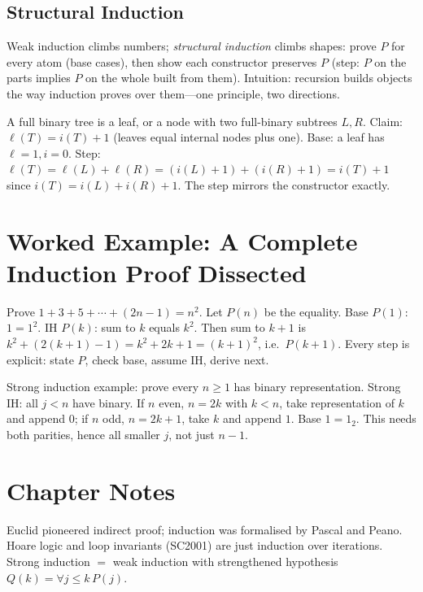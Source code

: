 \subsection{Structural Induction}
\label{sec:structural}
Weak induction climbs numbers; \emph{structural induction} climbs shapes: prove $P$ for every atom (base cases), then show each constructor preserves $P$ (step: $P$ on the parts implies $P$ on the whole built from them). Intuition: recursion builds objects the way induction proves over them---one principle, two directions.
\begin{example}
A full binary tree is a leaf, or a node with two full-binary subtrees $L,R$. Claim: $\ell(T)=i(T)+1$ (leaves equal internal nodes plus one). Base: a leaf has $\ell=1,i=0$. Step: $\ell(T)=\ell(L)+\ell(R)=(i(L)+1)+(i(R)+1)=i(T)+1$ since $i(T)=i(L)+i(R)+1$. The step mirrors the constructor exactly.
\end{example}

\section{Worked Example: A Complete Induction Proof Dissected}
Prove $1+3+5+\cdots+(2n-1)=n^2$. Let $P(n)$ be the equality. Base $P(1)$: $1=1^2$. IH $P(k)$: sum to $k$ equals $k^2$. Then sum to $k+1$ is $k^2+(2(k+1)-1)=k^2+2k+1=(k+1)^2$, i.e.\ $P(k+1)$. Every step is explicit: state $P$, check base, assume IH, derive next.

Strong induction example: prove every $n\ge1$ has binary representation. Strong IH: all $j<n$ have binary. If $n$ even, $n=2k$ with $k<n$, take representation of $k$ and append $0$; if $n$ odd, $n=2k+1$, take $k$ and append $1$. Base $1=1_2$. This needs both parities, hence all smaller $j$, not just $n-1$.

\section{Chapter Notes}
Euclid pioneered indirect proof; induction was formalised by Pascal and Peano. Hoare logic and loop invariants (SC2001) are just induction over iterations. Strong induction $=$ weak induction with strengthened hypothesis $Q(k)=\forall j\le k\,P(j)$.


